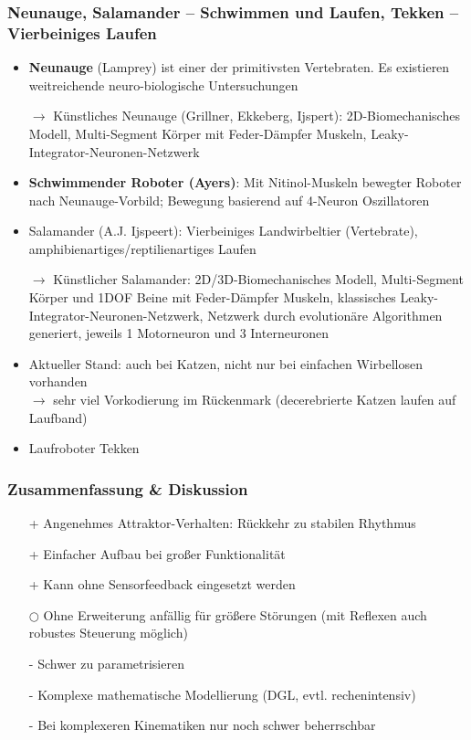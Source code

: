 \subsubsection{Neunauge, Salamander – Schwimmen und Laufen, Tekken – Vierbeiniges Laufen}
\begin{itemize}
\item \textbf{Neunauge} (Lamprey) ist einer der primitivsten Vertebraten. Es existieren weitreichende neuro-biologische Untersuchungen
\item[$\rightarrow$] Künstliches Neunauge (Grillner, Ekkeberg, Ijspert): 2D-Biomechanisches Modell, Multi-Segment Körper mit Feder-Dämpfer Muskeln, Leaky-Integrator-Neuronen-Netzwerk
\item \textbf{Schwimmender Roboter (Ayers)}: Mit Nitinol-Muskeln bewegter Roboter nach Neunauge-Vorbild; Bewegung basierend auf 4-Neuron Oszillatoren
\item Salamander (A.J. Ijspeert): Vierbeiniges Landwirbeltier (Vertebrate), amphibienartiges/reptilienartiges Laufen
\item[$\rightarrow$] Künstlicher Salamander: 2D/3D-Biomechanisches Modell, Multi-Segment Körper und 1DOF Beine mit Feder-Dämpfer Muskeln, \glqq klassisches\grqq{} Leaky-Integrator-Neuronen-Netzwerk, Netzwerk durch evolutionäre Algorithmen generiert, jeweils 1 Motorneuron und 3 Interneuronen
\item Aktueller Stand: auch bei Katzen, nicht nur bei einfachen Wirbellosen vorhanden\\
$\rightarrow$ sehr viel Vorkodierung im Rückenmark (decerebrierte Katzen laufen auf Laufband)
\item Laufroboter Tekken 
\end{itemize}
\subsubsection{Zusammenfassung \& Diskussion}
\begin{itemize}
\item[+] Angenehmes Attraktor-Verhalten: Rückkehr zu stabilen Rhythmus
\item[+] Einfacher Aufbau bei großer Funktionalität
\item[+] Kann ohne Sensorfeedback eingesetzt werden
\item[$\bigcirc$] Ohne Erweiterung anfällig für größere Störungen (mit Reflexen auch robustes Steuerung möglich)
\item[-] Schwer zu parametrisieren
\item[-] Komplexe mathematische Modellierung (DGL, evtl. rechenintensiv)
\item[-] Bei komplexeren Kinematiken nur noch schwer beherrschbar
\end{itemize}